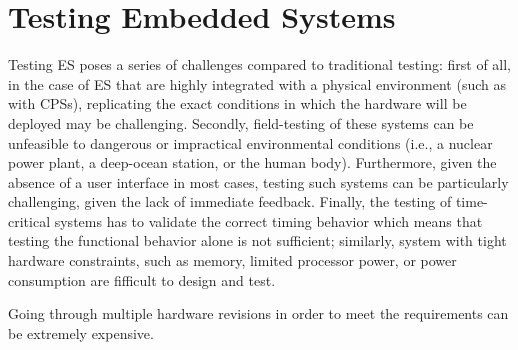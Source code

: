 \section{Testing Embedded Systems}
Testing ES poses a series of challenges compared to traditional testing: first of all, in the case of ES that are highly integrated with a physical environment (such as with CPSs), replicating the exact conditions in which the hardware will be deployed may be challenging. Secondly, field-testing of these systems can be unfeasible to dangerous or impractical environmental conditions (i.e., a nuclear power plant, a deep-ocean station, or the human body). Furthermore, given the absence of a user interface in most cases, testing such systems can be particularly challenging, given the lack of immediate feedback. Finally, the testing of time-critical systems has to validate the correct timing behavior which means that testing the functional behavior alone is not sufficient; similarly, system with tight hardware constraints, such as memory, limited processor power, or power consumption are fifficult to design and test.

Going through multiple hardware revisions in order to meet the requirements can be extremely expensive.

